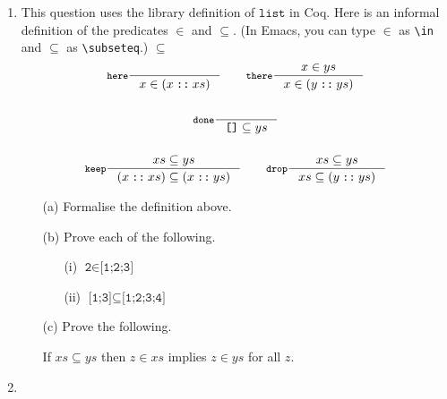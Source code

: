 \documentclass{examhons2018}
\begin{document}
\begin{enumerate}
 
\item \rubricqA

\newcommand{\key}{\texttt}
\newcommand{\List}{\key{list}}
\newcommand{\nil}{\texttt{[]}}
\newcommand{\cons}{\mathbin{\key{::}}}
\newcommand{\member}{\key{member}}
\newcommand{\sublist}{\key{sublist}}

This question uses the library definition of $\List$ in Coq.
Here is an informal definition of the predicates $\in$
and $\subseteq$.  (In Emacs, you can type $\in$ as \verb$\in$ and $\subseteq$ as \verb$\subseteq$.)
$\subseteq$
\begin{gather*}
\inference[$\key{here}$]
  {}
  {x \in (x \cons xs)}
\qquad
\inference[$\key{there}$]
  {x \in ys}
  {x \in (y \cons ys)}
\\~\\
\inference[$\key{done}$]
  {}
  {\nil \subseteq ys}
\\~\\
\inference[$\key{keep}$]
  {xs \subseteq ys}
  {(x \cons xs) \subseteq (x \cons ys)}
\qquad
\inference[$\key{drop}$]
  {xs \subseteq ys}
  {xs \subseteq (y \cons ys)}
\end{gather*}

\begin{itemize}

\item[(a)] Formalise the definition above.

\item[(b)] Prove each of the following.
  \begin{itemize}
  \item[(i)]  $\key{2} \in \key{[1;2;3]}$
  \item[(ii)]  $\key{[1;3]} \subseteq \key{[1;2;3;4]}$
  \end{itemize}

\item[(c)] Prove the following.
\begin{center}
If $xs \subseteq ys$ then $z \in xs$ implies $z \in ys$ for all $z$.
\end{center}    

\end{itemize}

\newpage

\item \rubricqB

\newcommand{\Tree}{\texttt{Tree}}
\newcommand{\leaf}{\texttt{leaf}}
\newcommand{\branch}{\texttt{branch}}
\newcommand{\CASET}{\texttt{caseT}}
\newcommand{\caseT}[6]{\texttt{case}~#1~\texttt{[leaf}~#2~\Rightarrow~#3~\texttt{|}~#4~\texttt{branch}~#5~\Rightarrow~#6\texttt{]}}
\newcommand{\ubar}{\texttt{\underline{~}}}
\newcommand{\comma}{\,\texttt{,}\,}
\newcommand{\V}{\texttt{V}}
\newcommand{\dash}{\texttt{-}}
\newcommand{\Value}{\texttt{Value}}
\newcommand{\becomes}{\longrightarrow}
\newcommand{\subst}[3]{#1~\texttt{[}~#2~\texttt{:=}~#3~\texttt{]}}



\end{enumerate}
\end{document}
